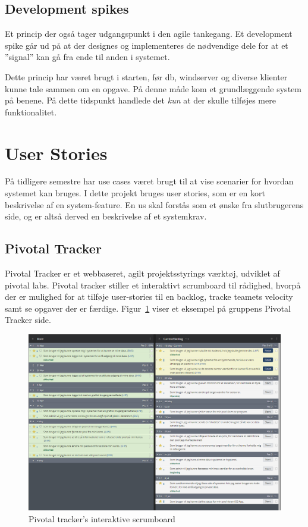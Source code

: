\subsection{Development spikes}
Et princip der også tager udgangspunkt i den agile tankegang. Et development spike \cite{scaledagile} går ud på at der designes og implementeres de nødvendige dele for at et ''signal'' kan gå fra ende til anden i systemet.

Dette princip har været brugt i starten, før \gls{db}, \gls{windserver} og diverse klienter kunne tale sammen om en opgave. På denne måde kom et grundlæggende system på benene. På dette tidspunkt handlede det \textit{kun} at der skulle tilføjes mere funktionalitet.

\section{User Stories}
På tidligere semestre har use cases været brugt til at vise scenarier for hvordan systemet kan bruges. I dette projekt bruges user stories\cite{margaretrouse2015}, som er en kort beskrivelse af en system-feature. En \gls{us} skal forstås som et ønske fra slutbrugerens side, og er altså derved en beskrivelse af et systemkrav.

\subsection{Pivotal Tracker}
Pivotal Tracker er et webbaseret, agilt projektsstyrings værktøj, udviklet af pivotal labs. Pivotal tracker stiller et interaktivt scrumboard til rådighed, hvorpå der er mulighed for at tilføje user-stories til en backlog, tracke teamets velocity samt se opgaver der er færdige. Figur~\ref{fig:scrumboard} viser et eksempel på gruppens Pivotal Tracker side.

\begin{figure}
	\centering
	\includegraphics[width=\linewidth]{figs/processProjektGennemforsel/scrumboard.PNG}
	\caption{Pivotal tracker's interaktive scrumboard}
	\label{fig:scrumboard}
\end{figure}

